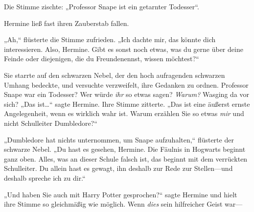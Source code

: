 Die Stimme zischte: „Professor Snape ist ein getarnter Todesser“.

Hermine ließ fast ihren Zauberstab fallen.

„Ah,“ flüsterte die Stimme zufrieden. „Ich dachte mir, das könnte dich interessieren. Also, Hermine. Gibt es sonst noch etwas, was du gerne über deine Feinde oder diejenigen, die du Freundenennst, wissen möchtest?“

Sie starrte auf den schwarzen Nebel, der den hoch aufragenden schwarzen Umhang bedeckte, und versuchte verzweifelt, ihre Gedanken zu ordnen. Professor Snape war ein Todesser? Wer würde \emph{ihr} so etwas sagen? \emph{Warum?} Wasging da vor sich? „Das ist…“ sagte Hermine. Ihre Stimme zitterte. „Das ist eine äußerst ernste Angelegenheit, wenn es wirklich wahr ist. Warum erzählen Sie so etwas \emph{mir} und nicht Schulleiter Dumbledore?“

„Dumbledore hat nichts unternommen, um Snape aufzuhalten,“ flüsterte der schwarze Nebel. „Du hast es gesehen, Hermine. Die Fäulnis in Hogwarts beginnt ganz oben. Alles, was an dieser Schule falsch ist, das beginnt mit dem verrückten Schulleiter. Du allein hast es gewagt, ihn deshalb zur Rede zur Stellen—und deshalb spreche ich zu dir.“

„Und haben Sie auch mit Harry Potter gesprochen?“ sagte Hermine und hielt ihre Stimme so gleichmäßig wie möglich. Wenn \emph{dies} sein hilfreicher Geist war—

